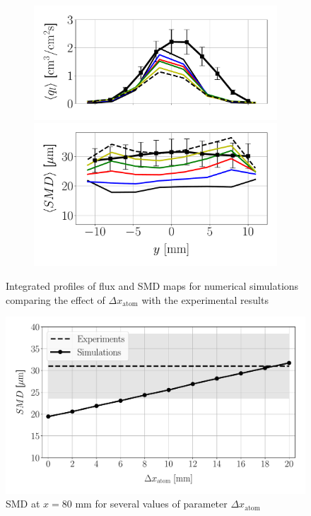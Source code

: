 \begin{figure}[h!]
\begin{subfigure}[b]{0.4\textwidth}
	\flushleft
   \includegraphics[scale=0.35]{./part2_developments/figures_ch6_lagrangian_JICF/params_dx_atom/profiles/flux_along_y}\\
   \vspace{-0.16in}
   \includegraphics[scale=0.35]{./part2_developments/figures_ch6_lagrangian_JICF/params_dx_atom/profiles/SMD_along_y}
\end{subfigure}

\caption{Integrated profiles of flux and SMD maps for numerical simulations comparing the effect of $\Delta x_\mathrm{atom}$ with the experimental results}
\label{fig:profiles_LGS_JICF_dx_aom}
\end{figure}



\begin{figure}[h!]
\centering
\includegraphics[scale=0.5]{./part2_developments/figures_ch6_lagrangian_JICF/params_dx_atom/SMD_vs_dx_atom}
\caption{SMD at $x = 80$ mm for several values of parameter $\Delta x_\mathrm{atom}$ }
\label{fig:SMD_vs_dx_atom}
\end{figure}

